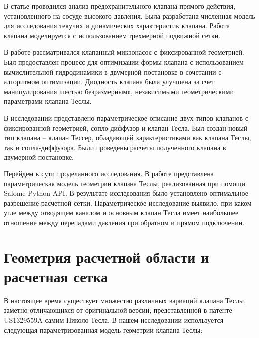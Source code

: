 \documentclass[10pt,a4paper]{book}
\begin{document}
    В статье \cite{SONG2014407} проводился анализ предохранительного клапана прямого действия, установленного на сосуде высокого давления. Была разработана численная модель для исследования текучих и динамических характеристик клапана. Работа клапана моделируется с использованием трехмерной подвижной сетки.
    
    В работе \cite{OptimizationOfTheFixed-GeometryValve} рассматривался клапанный микронасос с фиксированной геометрией. Был предоставлен процесс для оптимизации формы клапана с использованием вычислительной гидродинамики в двумерной постановке в сочетании с алгоритмом оптимизации. Диодность клапана была улучшена за счет манипулирования шестью безразмерными, независимыми геометрическими параметрами клапана Теслы.
    
    В исследовании \cite{inproceedings} представлено параметрическое описание двух типов клапанов с фиксированной геометрией, сопло-диффузор и клапан Тесла. Был создан новый тип клапана -- клапан Тессер, обладающий характеристиками как клапана Теслы, так и сопла-диффузора. Были проведены расчеты полученного клапана в двумерной постановке. 
    
    Перейдем к сути проделанного исследования. В работе представлена параметрическая модель геометрии клапана Теслы, реализованная при помощи Salome Python API. В результате исследования было установлено оптимальное разрешение расчетной сетки. Параметрическое исследование выявило, при каком угле между отводящем каналом и основным клапан Тесла имеет наибольшее отношение между перепадами давления при обратном и прямом подключении.
    
    \section{Геометрия расчетной области и расчетная сетка}\label{p:roles}
    
    В настоящее время существует множество различных вариаций клапана Теслы, заметно отличающихся от оригинальной версии, представленной в патенте US1329559A самим Николо Тесла. В нашем исследовании используется следующая параметризованная модель геометрии клапана Теслы:
    
\end{document}
